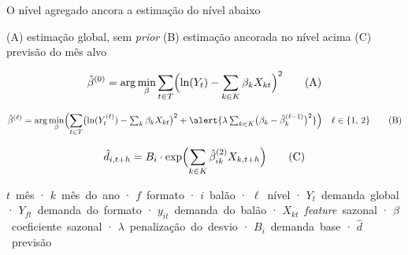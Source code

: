 \documentclass[11pt,aspectratio=169]{beamer}
\newcommand{\sy}[2]{\mbox{$#1$~#2}}
\newcommand{\notacao}[1]{%
  \vfill
  \noindent{\color{cinzaCla}\rule{\textwidth}{0.4pt}}%
  \par\vspace{0.12em}
  {\scriptsize\color{cinza}\linespread{0.84}\selectfont #1\par}%
}
\newcommand{\restricoes}[1]{%
  {\footnotesize\color{cinzaEsc}#1\par}%
}
\begin{document}
\begin{frame}{O nível agregado ancora a estimação do nível abaixo}

  \restricoes{%
    (A) estimação global, sem \textit{prior} \hfill
    (B) estimação ancorada no nível acima \hfill
    (C) previsão do mês alvo}

  \vspace{0.2em}
  {\footnotesize
  \begin{equation*}
    \hat{\beta}^{(0)} = \arg\min_{\beta} \sum_{t \in T}
      \Bigl( \ln(Y_t) - \sum_{k \in K} \beta_{k} X_{kt} \Bigr)^2 \tag{A}
  \end{equation*}

  \begin{equation*}
    \hat{\beta}^{(\ell)} = \arg\min_{\beta}
      \Bigl( \sum_{t \in T} \bigl( \ln(Y^{(\ell)}_{t}) - \textstyle\sum_{k} \beta_{k} X_{kt} \bigr)^2
      + \alert{\lambda \sum_{k \in K} \bigl( \beta_{k} - \hat{\beta}^{(\ell-1)}_{k} \bigr)^2} \Bigr)
      \quad \ell \in \{1,\,2\} \tag{B}
  \end{equation*}

  \begin{equation*}
    \hat{d}_{i,t+h} = B_{i} \cdot \exp\Bigl( \sum_{k \in K} \hat{\beta}^{(2)}_{ik} X_{k,t+h} \Bigr) \tag{C}
  \end{equation*}}

  \vspace{0.3em}
  \begin{center}
  \end{center}

  \notacao{%
    \sy{t}{mês} · \sy{k}{mês do ano} · \sy{f}{formato} · \sy{i}{balão} · \sy{\ell}{nível} · 
    \sy{Y_t}{demanda global} · \sy{Y_{ft}}{demanda do formato} · \sy{y_{it}}{demanda do balão} · 
    \sy{X_{kt}}{\textit{feature} sazonal} · \sy{\beta}{coeficiente sazonal} · 
    \sy{\lambda}{penalização do desvio} · \sy{B_i}{demanda base} · \sy{\hat{d}}{previsão}}


\end{frame}
\end{document}
